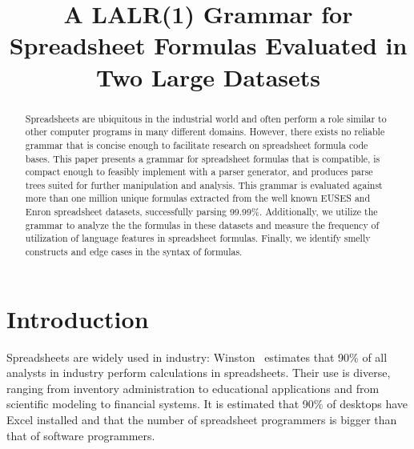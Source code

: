 \documentclass[conference]{IEEEtran}
\begin{document}
\title{A LALR(1) Grammar for Spreadsheet Formulas Evaluated in Two Large Datasets}

\author{
}
\maketitle

\begin{abstract}
Spreadsheets are ubiquitous in the industrial world and often perform a role similar to other computer programs in many different domains.
However, there exists no reliable grammar that is concise enough to facilitate research on spreadsheet formula code bases.
This paper presents a grammar for spreadsheet formulas that is compatible, is compact enough to feasibly implement with a parser generator, and produces parse trees suited for further manipulation and analysis. 
This grammar is evaluated against more than one million unique formulas extracted from the well known EUSES and Enron spreadsheet datasets, successfully parsing 99.99\%.
Additionally, we utilize the grammar to analyze the the formulas in these datasets and measure the frequency of utilization of language features in spreadsheet formulas.
Finally, we identify smelly constructs and edge cases in the syntax of formulas.
\end{abstract}

\IEEEpeerreviewmaketitle


\section{Introduction}
Spreadsheets are widely used in industry: Winston~\cite{Wins2001} estimates that 90\% of all analysts in industry perform calculations in
spreadsheets. Their use is diverse, ranging from inventory administration to educational applications and from scientific
modeling to financial systems. It is estimated that 90\% of desktops have Excel installed\cite{DBLP:conf/icse/BradleyM09} and that the number of spreadsheet programmers is bigger than that of software programmers\cite{DBLP:conf/vl/ScaffidiSM05}. 
\end{document}
